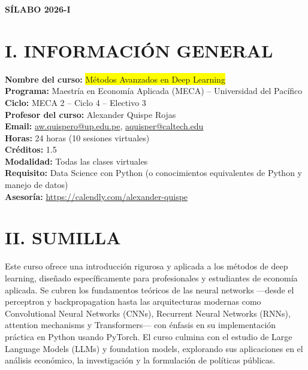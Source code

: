 \documentclass[11pt,a4paper]{article}
\begin{document}
\begin{center}
{\Large \textbf{S\'ILABO 2026-I}}
\end{center}

\vspace{0.5cm}

\section*{I. INFORMACI\'ON GENERAL}

\textbf{Nombre del curso:} \colorbox{yellow}{M\'etodos Avanzados en Deep Learning} \\
\textbf{Programa:} Maestr\'ia en Econom\'ia Aplicada (MECA) -- Universidad del Pac\'ifico \\
\textbf{Ciclo:} MECA 2 -- Ciclo 4 -- Electivo 3 \\
\textbf{Profesor del curso:} Alexander Quispe Rojas \\
\textbf{Email:} \href{mailto:aw.quispero@up.edu.pe}{aw.quispero@up.edu.pe}, \href{mailto:aquisper@caltech.edu}{aquisper@caltech.edu} \\
\textbf{Horas:} 24 horas (10 sesiones virtuales) \\
\textbf{Cr\'editos:} 1.5 \\
\textbf{Modalidad:} Todas las clases virtuales \\
\textbf{Requisito:} Data Science con Python (o conocimientos equivalentes de Python y manejo de datos) \\
\textbf{Asesor\'ia:} \url{https://calendly.com/alexander-quispe}

\section*{II. SUMILLA}

Este curso ofrece una introducci\'on rigurosa y aplicada a los m\'etodos de deep learning, dise\~nado espec\'ificamente para profesionales y estudiantes de econom\'ia aplicada. Se cubren los fundamentos te\'oricos de las neural networks ---desde el perceptron y backpropagation hasta las arquitecturas modernas como Convolutional Neural Networks (CNNs), Recurrent Neural Networks (RNNs), attention mechanisms y Transformers--- con \'enfasis en su implementaci\'on pr\'actica en Python usando PyTorch. El curso culmina con el estudio de Large Language Models (LLMs) y foundation models, explorando sus aplicaciones en el an\'alisis econ\'omico, la investigaci\'on y la formulaci\'on de pol\'iticas p\'ublicas.
\end{document}
